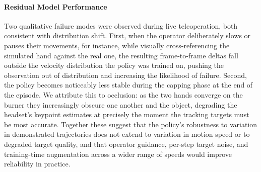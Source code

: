 \paragraph{Residual Model Performance}

Two qualitative failure modes were observed during live teleoperation, both consistent with distribution shift. First, when the operator deliberately slows or pauses their movements, for instance, while visually cross-referencing the simulated hand against the real one, the resulting
frame-to-frame deltas fall outside the velocity distribution the policy was trained on, pushing the observation out of distribution and increasing the likelihood of failure. Second, the policy becomes noticeably less stable during the capping phase at the end of the episode. We attribute
this to occlusion: as the two hands converge on the burner they increasingly obscure one another and the object, degrading the headset's keypoint estimates at precisely the moment the tracking targets must be most accurate. Together these suggest that the policy's robustness to variation in
demonstrated trajectories does not extend to variation in motion speed or to degraded target quality, and that operator guidance, per-step target noise, and training-time augmentation across a wider range of speeds would improve reliability in practice.





